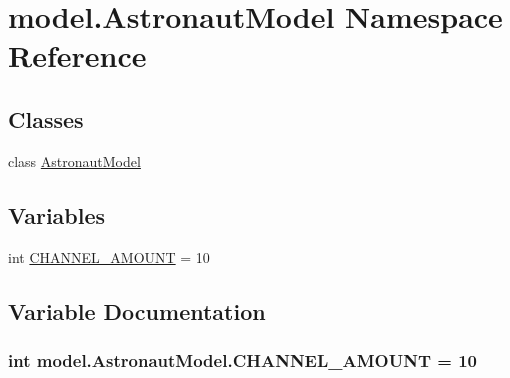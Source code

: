 \hypertarget{namespacemodel_1_1AstronautModel}{}\section{model.\+Astronaut\+Model Namespace Reference}
\label{namespacemodel_1_1AstronautModel}
\subsection*{Classes}
\begin{DoxyCompactItemize}
\item 
class \hyperlink{classmodel_1_1AstronautModel_1_1AstronautModel}{Astronaut\+Model}
\end{DoxyCompactItemize}
\subsection*{Variables}
\begin{DoxyCompactItemize}
\item 
int \hyperlink{namespacemodel_1_1AstronautModel_a299367388697b8b4172c553a6c137da9}{C\+H\+A\+N\+N\+E\+L\+\_\+\+A\+M\+O\+U\+N\+T} = 10
\end{DoxyCompactItemize}


\subsection{Variable Documentation}
\hypertarget{namespacemodel_1_1AstronautModel_a299367388697b8b4172c553a6c137da9}{}
\subsubsection[{C\+H\+A\+N\+N\+E\+L\+\_\+\+A\+M\+O\+U\+N\+T}]{\setlength{\rightskip}{0pt plus 5cm}int model.\+Astronaut\+Model.\+C\+H\+A\+N\+N\+E\+L\+\_\+\+A\+M\+O\+U\+N\+T = 10}\label{namespacemodel_1_1AstronautModel_a299367388697b8b4172c553a6c137da9}
